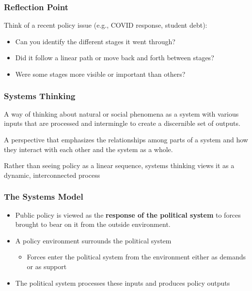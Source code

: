 \documentclass[10pt]{beamer}
\begin{document}
\begin{frame}
\frametitle{Reflection Point}

\begin{block}{Think of a recent policy issue (e.g., COVID response, student debt):}
\begin{itemize}
\item Can you identify the different stages it went through?
\item Did it follow a linear path or move back and forth between stages?
\item Were some stages more visible or important than others?
\end{itemize}
\end{block}

\end{frame}

\begin{frame}
\frametitle{Systems Thinking}

\begin{block}{}
A way of thinking about natural or social phenomena as a system with various inputs that are processed and intermingle to create a discernible set of outputs.
\end{block}

\pause
\begin{block}{}
A perspective that emphasizes the relationships among parts of a system and how they interact with each other and the system as a whole.
\end{block}

\pause
\vspace{0.5cm}
\centering
Rather than seeing policy as a linear sequence, systems thinking views it as a dynamic, interconnected process

\end{frame}

\begin{frame}
\frametitle{The Systems Model}

\begin{block}{}
\begin{itemize}
\item<1-> Public policy is viewed as the \textbf{response of the political system} to forces brought to bear on it from the outside environment.
\item<2-> A policy environment surrounds the political system
\begin{itemize}
\item Forces enter the political system from the environment either as demands or as support
\end{itemize}
\item<3-> The political system processes these inputs and produces policy outputs
\end{itemize}
\end{block}

\end{frame}
\end{document}
